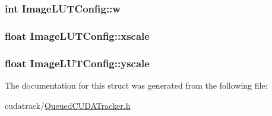 \subsubsection[{\texorpdfstring{w}{w}}]{\setlength{\rightskip}{0pt plus 5cm}int Image\+L\+U\+T\+Config\+::w}\hypertarget{struct_image_l_u_t_config_a3ec6c4f9e7f8774031877239a7b4872a}{}\label{struct_image_l_u_t_config_a3ec6c4f9e7f8774031877239a7b4872a}
\subsubsection[{\texorpdfstring{xscale}{xscale}}]{\setlength{\rightskip}{0pt plus 5cm}float Image\+L\+U\+T\+Config\+::xscale}\hypertarget{struct_image_l_u_t_config_a6acaec2b516bb387269973af678c9b6d}{}\label{struct_image_l_u_t_config_a6acaec2b516bb387269973af678c9b6d}
\subsubsection[{\texorpdfstring{yscale}{yscale}}]{\setlength{\rightskip}{0pt plus 5cm}float Image\+L\+U\+T\+Config\+::yscale}\hypertarget{struct_image_l_u_t_config_ac335be6537d81d7069a5f383c2bef603}{}\label{struct_image_l_u_t_config_ac335be6537d81d7069a5f383c2bef603}


The documentation for this struct was generated from the following file\+:\begin{DoxyCompactItemize}
\item 
cudatrack/\hyperlink{_queued_c_u_d_a_tracker_8h}{Queued\+C\+U\+D\+A\+Tracker.\+h}\end{DoxyCompactItemize}
